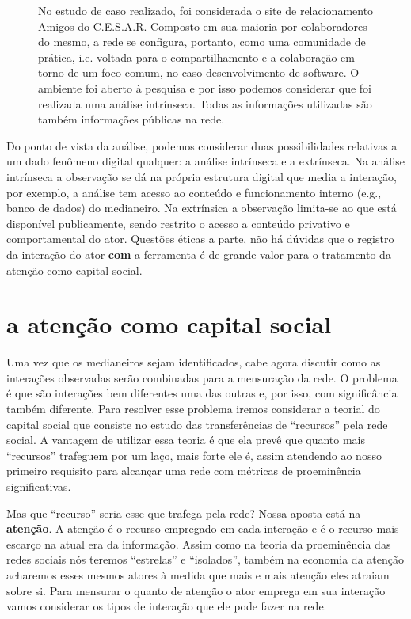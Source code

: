 \documentclass{article}
\begin{document}
\begin{figure}
\begin{boxedminipage}{2in}
No estudo de caso realizado, foi considerada o site de relacionamento Amigos do
C.E.S.A.R. Composto em sua maioria por colaboradores do mesmo, a rede se
configura, portanto, como uma comunidade de prática, i.e. voltada para o
compartilhamento e a colaboração em torno de um foco comum, no caso
desenvolvimento de software. O ambiente foi aberto à pesquisa e por isso podemos
considerar que foi realizada uma análise intrínseca. Todas as informações
utilizadas são também informações públicas na rede.
\end{boxedminipage}
\end{figure}
Do ponto de vista da análise, podemos considerar duas possibilidades relativas a
um dado fenômeno digital qualquer: a análise intrínseca e a extrínseca. Na
análise intrínseca a observação se dá na própria estrutura digital que media a
interação, por exemplo, a análise tem acesso ao conteúdo e funcionamento
interno (e.g., banco de dados) do medianeiro. Na extrínsica a observação
limita-se ao que está disponível publicamente, sendo restrito o acesso a
conteúdo privativo e comportamental do ator. Questões éticas a parte, não há
dúvidas que o registro da interação do ator \textbf{com} a ferramenta é de
grande valor para o tratamento da atenção como capital social.

\section{a atenção como capital social}

Uma vez que os medianeiros sejam identificados, cabe agora discutir como as
interações observadas serão combinadas para a mensuração da rede. O problema é
que são interações bem diferentes uma das outras e, por isso, com significância
também diferente. Para resolver esse problema iremos considerar a teorial do
capital social que consiste no estudo das transferências de ``recursos'' pela
rede social. A vantagem de utilizar essa teoria é que ela prevê que quanto mais
``recursos'' trafeguem por um laço, mais forte ele é, assim atendendo ao nosso
primeiro requisito para alcançar uma rede com métricas de proeminência
significativas.

Mas que ``recurso'' seria esse que trafega pela rede? Nossa aposta está na
\textbf{atenção}. A atenção é o recurso empregado em cada interação e é o
recurso mais escarço na atual era da informação. Assim como na teoria da
proeminência das redes sociais nós teremos ``estrelas'' e ``isolados'', também
na economia da atenção acharemos esses mesmos atores à medida que mais e mais
atenção eles atraiam sobre si. Para mensurar o quanto de atenção o ator emprega
em sua interação vamos considerar os tipos de interação que ele pode fazer na
rede.
\end{document}

